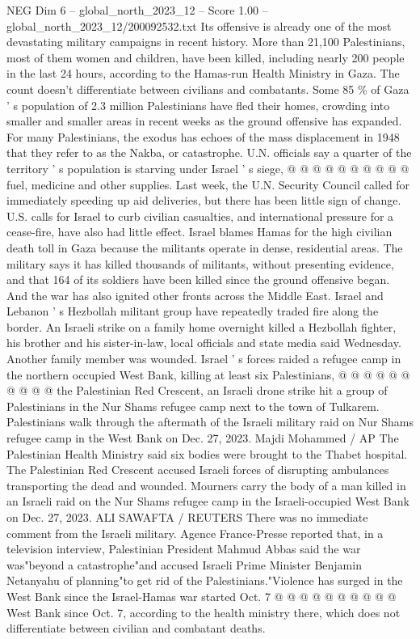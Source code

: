 \begin{textsample}{NEG Dim 6 – global\_north\_2023\_12 – Score 1.00 – global\_north\_2023\_12/200092532.txt}
Its offensive is already one of the most devastating military campaigns in recent history.
More than 21,100 Palestinians, most of them women and children, have been killed, including nearly 200 people in the last 24 hours, according to the Hamas-run Health Ministry in Gaza.
The count doesn't differentiate between civilians and combatants.
Some 85 \% of Gaza ' s population of 2.3 million Palestinians have fled their homes, crowding into smaller and smaller areas in recent weeks as the ground offensive has expanded.
For many Palestinians, the exodus has echoes of the mass displacement in 1948 that they refer to as the Nakba, or catastrophe.
U.N. officials say a quarter of the territory ' s population is starving under Israel ' s siege, @ @ @ @ @ @ @ @ @ @ fuel, medicine and other supplies.
Last week, the U.N.
Security Council called for immediately speeding up aid deliveries, but there has been little sign of change.
U.S. calls for Israel to curb civilian casualties, and international pressure for a cease-fire, have also had little effect.
Israel blames Hamas for the high civilian death toll in Gaza because the militants operate in dense, residential areas.
The military says it has killed thousands of militants, without presenting evidence, and that 164 of its soldiers have been killed since the ground offensive began.
And the war has also ignited other fronts across the Middle East.
Israel and Lebanon ' s Hezbollah militant group have repeatedly traded fire along the border.
An Israeli strike on a family home overnight killed a Hezbollah fighter, his brother and his sister-in-law, local officials and state media said Wednesday.
Another family member was wounded.
Israel ' s forces raided a refugee camp in the northern occupied West Bank, killing at least six Palestinians, @ @ @ @ @ @ @ @ @ @ the Palestinian Red Crescent, an Israeli drone strike hit a group of Palestinians in the Nur Shams refugee camp next to the town of Tulkarem.
Palestinians walk through the aftermath of the Israeli military raid on Nur Shams refugee camp in the West Bank on Dec. 27, 2023.
Majdi Mohammed / AP The Palestinian Health Ministry said six bodies were brought to the Thabet hospital.
The Palestinian Red Crescent accused Israeli forces of disrupting ambulances transporting the dead and wounded.
Mourners carry the body of a man killed in an Israeli raid on the Nur Shams refugee camp in the Israeli-occupied West Bank on Dec. 27, 2023.
ALI SAWAFTA / REUTERS There was no immediate comment from the Israeli military.
Agence France-Presse reported that, in a television interview, Palestinian President Mahmud Abbas said the war was"beyond a catastrophe"and accused Israeli Prime Minister Benjamin Netanyahu of planning"to get rid of the Palestinians."Violence has surged in the West Bank since the Israel-Hamas war started Oct. 7 @ @ @ @ @ @ @ @ @ @ West Bank since Oct. 7, according to the health ministry there, which does not differentiate between civilian and combatant deaths.

\end{textsample}
